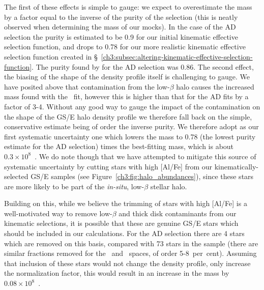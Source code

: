 The first of these effects is simple to gauge: we expect to overestimate the mass by a factor equal to the inverse of the purity of the selection (this is neatly observed when determining the mass of our mocks). In the case of the AD selection the purity is estimated to be 0.9 for our initial kinematic effective selection function, and drops to 0.78 for our more realistic kinematic effective selection function created in \S~\ref{ch3:subsec:altering-kinematic-effective-selection-function}. The purity found by \cite{lane22} for the AD selection was 0.86. The second effect, the biasing of the shape of the density profile itself is challenging to gauge. We have posited above that contamination from the low-$\beta$ halo causes the increased mass found with the \JRLz\ fit, however this is higher than that for the AD fits by a factor of 3-4. Without any good way to gauge the impact of the contamination on the shape of the GS/E halo density profile we therefore fall back on the simple, conservative estimate being of order the inverse purity. We therefore adopt as our first systematic uncertainty one which lowers the mass to 0.78 (the lowest purity estimate for the AD selection) times the best-fitting mass, which is about $0.3\times10^{8}$~\Msun. We do note though that we have attempted to mitigate this source of systematic uncertainty by cutting stars with high [Al/Fe] from our kinematically-selected GS/E samples (see Figure~\ref{ch3:fig:halo_abundances}), since these stars are more likely to be part of the \textit{in-situ}, low-$\beta$ stellar halo.

Building on this, while we believe the trimming of stars with high [Al/Fe] is a well-motivated way to remove low-$\beta$ and thick disk contaminants from our kinematic selections, it is possible that these are genuine GS/E stars which should be included in our calculations. For the AD selection there are 4 stars which are removed on this basis, compared with 73 stars in the sample (there are similar fractions removed for the \eLz\ and \JRLz\ spaces, of order 5-8~per~cent). Assuming that inclusion of these stars would not change the density profile, only increase the normalization factor, this would result in an increase in the mass by $0.08\times10^{8}$~\Msun.

